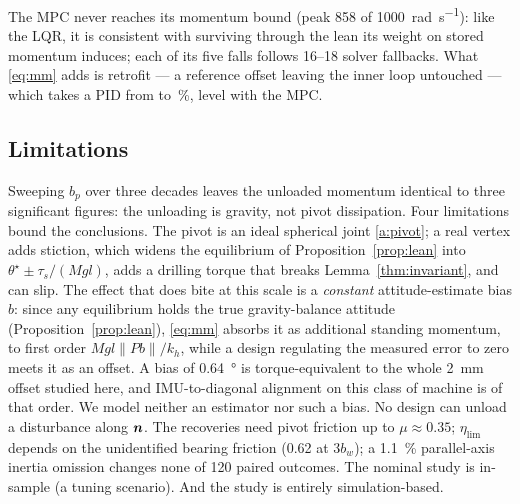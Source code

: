 The MPC never reaches its momentum bound (peak \num{858} of
\SI{1000}{\radian\per\second}): like the LQR, it is consistent with surviving through the lean its weight on
stored momentum induces; each of its five falls follows 16--18 solver
fallbacks. What
\eqref{eq:mm} adds is retrofit --- a reference offset leaving the inner loop
untouched --- which takes a PID from \pidMcCl{} to \pidMcMm\,\si{\percent}, level
with the MPC.

\subsection{Limitations}

Sweeping $b_p$ over three decades leaves the unloaded momentum identical to three
significant figures: the unloading is gravity, not pivot dissipation.
Four limitations bound the conclusions. The pivot is an ideal spherical joint
\ref{a:pivot}; a real vertex adds stiction, which widens the equilibrium of
Proposition~\ref{prop:lean} into $\theta^\star\pm\tau_s/(Mgl)$, adds a drilling
torque that breaks Lemma~\ref{thm:invariant}, and can slip.
The effect that does bite at this scale is a \emph{constant}
attitude-estimate bias $b$: since any equilibrium holds the true gravity-balance
attitude (Proposition~\ref{prop:lean}), \eqref{eq:mm} absorbs it as additional
standing momentum, to first order $Mgl\|Pb\|/k_h$, while a design regulating the
measured error to zero meets it as an offset. A bias of \SI{0.64}{\degree} is
torque-equivalent to the whole \SI{2}{\milli\metre} offset studied here, and
IMU-to-diagonal alignment on this class of machine is of that order. We model neither an estimator nor such a bias. No design can unload a
disturbance along $\boldsymbol{n}$. The recoveries need pivot friction up to
$\mu\approx0.35$; $\eta_{\lim}$ depends on the unidentified bearing friction
(0.62 at $3b_w$); a \SI{1.1}{\percent} parallel-axis inertia omission changes
none of 120 paired outcomes. The nominal study is in-sample (a tuning scenario). And the study is entirely simulation-based.

